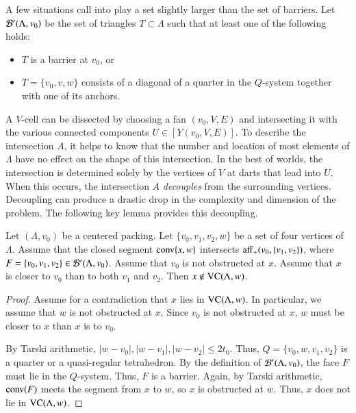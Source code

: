 A few situations call into play a set slightly larger than the set of barriers.
Let ${\mathcal B}'(\Lambda,v_0)$ be the set of triangles $T\subset \Lambda$ such that at least one
of the following holds:
\begin{itemize}
    \item $T$ is a barrier at $v_0$, or
    \item $T=\{v_0,v,w\}$ consists of a diagonal of a quarter in the
    $Q$-system together with one of its anchors.
\end{itemize}


A $V$-cell  can be dissected by choosing a fan
$(v_0,V,E)$ and intersecting it with the various connected components
$U\in [Y(v_0,V,E)]$.  To describe the intersection $A$, it
helps to know that the number and location of
most elements of $\Lambda$ have no effect on the shape of this intersection.
In the best of worlds, the intersection is determined solely 
by the vertices of $V$
at darts that lead into $U$.  When this occurs, the intersection $A$ 
{\it decouples} from the surrounding vertices. Decoupling  can
produce
a drastic drop in the complexity and dimension of the problem.
The following key lemma provides this decoupling.

\begin{lemma} 
Let $(\Lambda,v_0)$ be a centered packing.  Let $\{v_0,v_1,v_2,w\}$
be a set of four vertices of $\Lambda$. 
Assume that the closed segment
${\operatorname{conv}}\{x,w\}$ intersects ${\operatorname{aff}}_+(v_0,\{v_1,v_2\})$, where
$F = \{v_0,v_1,v_2\}\in {\mathcal B}'(\Lambda,v_0)$. Assume that $v_0$ 
is not obstructed at $x$. Assume that $x$ is closer to $v_0$ 
than to both $v_1$ and $v_2$. Then $x\not\in{\operatorname{VC}}(\Lambda,w)$.
\end{lemma}


\begin{proof}
Assume for a contradiction that $x$ lies in ${\operatorname{VC}}(\Lambda,w)$. In
particular, we assume that $w$ is not obstructed at $x$.  Since
$v_0$ is not obstructed at $x$, $w$ must be closer to $x$
than $x$ is to $v_0$.

By Tarski arithmetic, 
   $|w-v_0|,|w-v_1|,|w-v_2|\le 2t_0$.  Thus, $Q=\{v_0,w,v_1,v_2\}$ is
a quarter or a quasi-regular tetrahedron.  By the definition of
${\mathcal B}'(\Lambda,v_0)$, the face $F$ must lie in the $Q$-system.  Thus,
$F$ is a barrier.  Again, by Tarski arithmetic,
${\operatorname{conv}}(F)$ meets the segment from $x$ to $w$, so $x$ is obstructed
at $w$.  Thus, $x$ does not lie in ${\operatorname{VC}}(\Lambda,w)$.
\end{proof}


